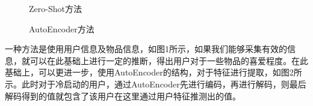 \begin{figure}[htb]        
\caption{\label{1} Zero-Shot方法}      
\end{figure}

\begin{figure}[htb]        
\caption{\label{2} AutoEncoder方法}      
\end{figure}
一种方法是使用用户信息及物品信息，如图1所示，如果我们能够采集有效的信息，就可以在此基础上进行一定的推断，得出用户对于一些物品的喜爱程度。在此基础上，可以更进一步，使用AutoEncoder的结构，对于特征进行提取，如图2所示。此时对于冷启动的用户，通过AutoEncoder先进行编码，再进行解码，则最后解码得到的值就包含了该用户在这里通过用户特征推测出的值\cite{zeroshot}。

